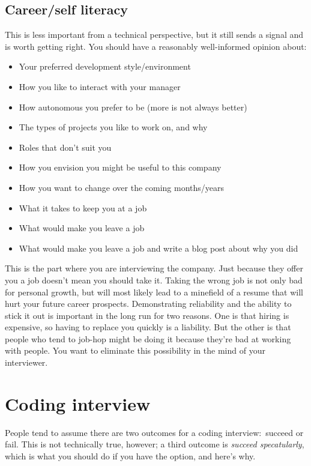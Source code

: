 \documentclass{article}
\begin{document}
\subsection{Career/self literacy}
    This is less important from a technical perspective, but it still sends a
    signal and is worth getting right. You should have a reasonably
    well-informed opinion about:

\begin{itemize}
\item{Your preferred development style/environment}
\item{How you like to interact with your manager}
\item{How autonomous you prefer to be (more is not always better)}
\item{The types of projects you like to work on, and why}
\item{Roles that don't suit you}
\item{How you envision you might be useful to this company}
\item{How you want to change over the coming months/years}
\item{What it takes to keep you at a job}
\item{What would make you leave a job}
\item{What would make you leave a job and write a blog post about why}
  you did
\end{itemize}

    This is the part where you are interviewing the company. Just because they
    offer you a job doesn't mean you should take it. Taking the wrong job is
    not only bad for personal growth, but will most likely lead to a minefield
    of a resume that will hurt your future career prospects. Demonstrating
    reliability and the ability to stick it out is important in the long run
    for two reasons. One is that hiring is expensive, so having to replace you
    quickly is a liability. But the other is that people who tend to job-hop
    might be doing it because they're bad at working with people. You want to
    eliminate this possibility in the mind of your interviewer.

\section{Coding interview}\label{sec:coding-interview}
  People tend to assume there are two outcomes for a coding interview:~succeed
  or fail. This is not technically true, however; a third outcome is {\em
  succeed specatularly}, which is what you should do if you have the option,
  and here's why.
\end{document}
